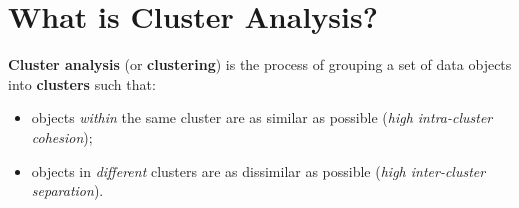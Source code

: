 
\section{What is Cluster Analysis?}
\label{sec:cluster-analysis}

\begin{definition}
\textbf{Cluster analysis} (or \textbf{clustering}) is the process of grouping a set of data objects into \textbf{clusters} such that:
\begin{itemize}
  \item objects \textit{within} the same cluster are as similar as possible (\textit{high intra-cluster cohesion});
  \item objects in \textit{different} clusters are as dissimilar as possible (\textit{high inter-cluster separation}).
\end{itemize}
\end{definition}

